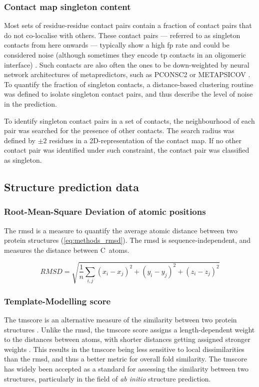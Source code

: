 \subsubsection{Contact map singleton content}
Most sets of residue-residue contact pairs contain a fraction of contact pairs that do not co-localise with others. These contact pairs --- referred to as singleton contacts from here onwards --- typically show a high \gls{fp} rate and could be considered noise (although sometimes they encode \gls{tp} contacts in an oligomeric interface) \cite{Skwark2014-qp}. Such contacts are also often the ones to be down-weighted by neural network architectures of metapredictors, such as PCONSC2 \cite{Skwark2014-qp} or METAPSICOV \cite{Jones2015-vq}. To quantify the fraction of singleton contacts, a distance-based clustering routine was defined to isolate singleton contact pairs, and thus describe the level of noise in the prediction.

To identify singleton contact pairs in a set of contacts, the neighbourhood of each pair was searched for the presence of other contacts. The search radius was defined by $\pm2$ residues in a 2D-representation of the contact map. If no other contact pair was identified under such constraint, the contact pair was classified as singleton.

\subsection{Structure prediction data}
\subsubsection{Root-Mean-Square Deviation of atomic positions}
The \gls{rmsd} is a measure to quantify the average atomic distance between two protein structures (\cref{eq:methods_rmsd}). The \gls{rmsd} is sequence-independent, and measures the distance between C\textalpha\ atoms.

\begin{equation}
    RMSD=\sqrt{\frac{1}{n}\sum_{i,j}{(x_i-x_j)^2+(y_i-y_j)^2+(z_i-z_j)^2}}
    \label{eq:methods_rmsd}
\end{equation}

\subsubsection{Template-Modelling score}
The \gls{tmscore} is an alternative measure of the similarity between two protein structures \cite{Zhang2004-ha}. Unlike the \gls{rmsd}, the \gls{tmscore} score assigns a length-dependent weight to the distances between atoms, with shorter distances getting assigned stronger weights \cite{Zhang2004-ha}. This results in the \gls{tmscore} being less sensitive to local dissimilarities than the \gls{rmsd}, and thus a better metric for overall fold similarity. The \gls{tmscore} has widely been accepted as a standard for assessing the similarity between two structures, particularly in the field of \textit{ab initio} structure prediction.

